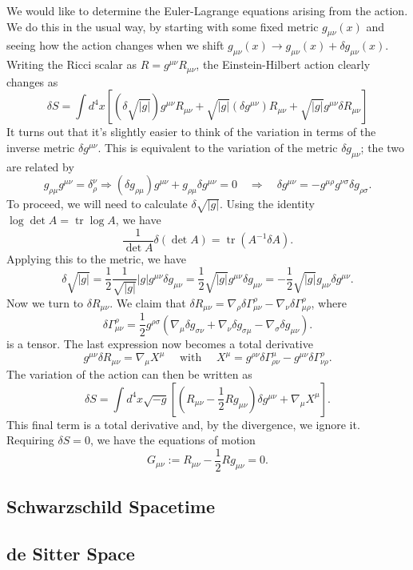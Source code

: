 \documentclass[aps,prb,superscriptaddress,nofootinbib]{revtex4}
\begin{document}
We would like to determine the Euler-Lagrange equations arising from the action. 
We do this in the usual way, by starting with some fixed metric $g_{\mu \nu}(x)$ and seeing how the action changes when we shift $g_{\mu \nu}(x) \rightarrow g_{\mu \nu}(x)+\delta g_{\mu \nu}(x)$.
Writing the Ricci scalar as $R=g^{\mu \nu} R_{\mu \nu}$, the Einstein-Hilbert action clearly changes as
$$
	\delta S=\int d^4 x\left[(\delta \sqrt{|g|}) g^{\mu \nu} R_{\mu \nu}+\sqrt{|g|}\left(\delta g^{\mu \nu}\right) R_{\mu \nu}+\sqrt{|g|} g^{\mu \nu} \delta R_{\mu \nu}\right]
$$
It turns out that it's slightly easier to think of the variation in terms of the inverse metric $\delta g^{\mu \nu}$. 
This is equivalent to the variation of the metric $\delta g_{\mu \nu}$; the two are related by
$$
g_{\rho \mu} g^{\mu \nu}=\delta_\rho^\nu \Rightarrow\left(\delta g_{\rho \mu}\right) g^{\mu \nu}+g_{\rho \mu} \delta g^{\mu \nu}=0 \quad \Rightarrow \quad \delta g^{\mu \nu}=-g^{\mu \rho} g^{\nu \sigma} \delta g_{\rho \sigma}.
$$
To proceed, we will need to calculate $\delta \sqrt{|g|}$.
Using the identity $\log \operatorname{det} A=\operatorname{tr} \log A$, we have
$$
\frac{1}{\operatorname{det} A} \delta(\operatorname{det} A)=\operatorname{tr}\left(A^{-1} \delta A\right).
$$
Applying this to the metric, we have
$$
\delta \sqrt{|g|}=\frac{1}{2} \frac{1}{\sqrt{|g|}}|g| g^{\mu \nu} \delta g_{\mu \nu}=\frac{1}{2} \sqrt{|g|} g^{\mu \nu} \delta g_{\mu \nu}
=-\frac{1}{2} \sqrt{|g|} g_{\mu \nu} \delta g^{\mu \nu}.
$$
Now we turn to $\delta R_{\mu\nu}$.
We claim that $\delta R_{\mu \nu}=\nabla_\rho \delta \Gamma_{\mu \nu}^\rho-\nabla_\nu \delta \Gamma_{\mu \rho}^\rho$, where
$$
\delta \Gamma_{\mu \nu}^\rho=\frac{1}{2} g^{\rho \sigma}\left(\nabla_\mu \delta g_{\sigma \nu}+\nabla_\nu \delta g_{\sigma \mu}-\nabla_\sigma \delta g_{\mu \nu}\right).
$$
is a tensor.
The last expression now becomes a total derivative 
$$
g^{\mu \nu} \delta R_{\mu \nu}=\nabla_\mu X^\mu \quad \text { with } \quad X^\mu=g^{\rho \nu} \delta \Gamma_{\rho \nu}^\mu-g^{\mu \nu} \delta \Gamma_{\nu \rho}^\rho.
$$
The variation of the action can then be written as
$$
\delta S=\int d^4 x \sqrt{-g}\left[\left(R_{\mu \nu}-\frac{1}{2} R g_{\mu \nu}\right) \delta g^{\mu \nu}+\nabla_\mu X^\mu\right].
$$
This final term is a total derivative and, by the divergence, we ignore it. 
Requiring $\delta S=0$, we have the equations of motion
$$
G_{\mu \nu}:=R_{\mu \nu}-\frac{1}{2} R g_{\mu \nu}=0.
$$




\subsection{Schwarzschild Spacetime}

\subsection{de Sitter Space}
\end{document}
